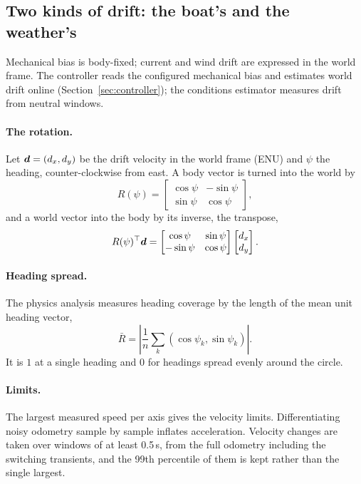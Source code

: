 \subsection{Two kinds of drift: the boat's and the weather's}

Mechanical bias is body-fixed; current and wind drift are expressed in the
world frame. The controller reads the configured mechanical bias and estimates
world drift online (Section~\ref{sec:controller}); the conditions estimator
measures drift from neutral windows.

\paragraph{The rotation.} Let $\bm d = (d_x, d_y)$ be the drift velocity in the
world frame (ENU) and $\psi$ the heading, counter-clockwise from east. A body
vector is turned into the world by
\[
  R(\psi) = \begin{bmatrix} \cos\psi & -\sin\psi\\ \sin\psi & \cos\psi \end{bmatrix},
\]
and a world vector into the body by its inverse, the transpose,
\[
  R(\psi)^\top \bm d =
  \begin{bmatrix} \cos\psi & \sin\psi\\ -\sin\psi & \cos\psi \end{bmatrix}
  \begin{bmatrix} d_x\\ d_y \end{bmatrix}.
\]
\paragraph{Heading spread.} The physics analysis measures heading coverage by
the length of the mean unit heading vector,
\[
  \bar R=\left|\frac1n\sum_k(\cos\psi_k,\sin\psi_k)\right|.
\]
It is $1$ at a single heading and $0$ for headings spread evenly around the circle.

\paragraph{Limits.} The largest measured speed per axis gives the velocity
limits. Differentiating noisy odometry sample by sample inflates acceleration.
Velocity changes are taken over windows of at least
0.5\,s, from the full odometry including the switching transients, and the 99th
percentile of them is kept rather than the single largest.

